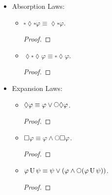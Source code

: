 \documentclass[12pt]{article}
\newcommand{\until}{\,\mathrm{U}\,}
\newcommand{\iscircle}{\mathord{\scalerel*{\bigcirc}{\square}}}
\begin{document}
\begin{itemize}
\begin{itemize}
\begin{proof}
            \end{proof}
            \item $\square\square\varphi \equiv \square\varphi$.
            \begin{proof}
                
            \end{proof}
            \item $(\varphi \until \psi) \until \psi \equiv \varphi \until \psi$.
            \begin{proof}
                
            \end{proof}
            \item $\varphi \until (\varphi \until \psi) \equiv \varphi \until \psi$.
            \begin{proof}
                
            \end{proof}
        \end{itemize}
        \item Absorption Laws:
        \begin{itemize}
            \item $\square\lozenge\square\varphi \equiv \lozenge\square\varphi$.
            \begin{proof}
                
            \end{proof}
            \item $\lozenge\square\lozenge\varphi \equiv \square\lozenge\varphi$.
            \begin{proof}
                
            \end{proof}
        \end{itemize}
        \item Expansion Laws:
        \begin{itemize}
            \item $\lozenge\varphi \equiv \varphi \lor \iscircle\lozenge\varphi$.
            \begin{proof}
                
            \end{proof}
            \item $\square\varphi \equiv \varphi \land \iscircle\square\varphi$.
            \begin{proof}
                
            \end{proof}
            \item $\varphi \until \psi \equiv \psi \lor (\varphi \land \iscircle(\varphi \until \psi))$.
            \begin{proof}
                
            \end{proof}
        \end{itemize}
    \end{itemize}
\end{document}
